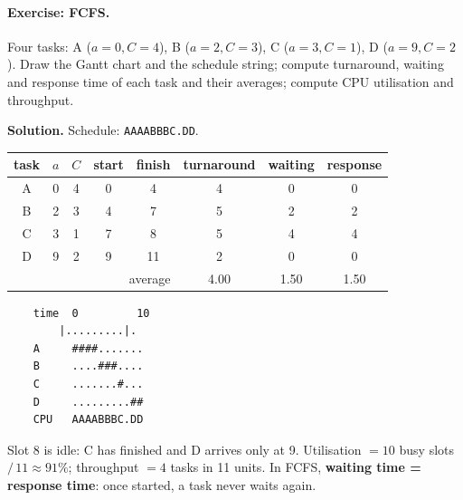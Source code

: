 \paragraph{Exercise: FCFS.} Four tasks: A ($a=0, C=4$), B ($a=2, C=3$), C ($a=3, C=1$), D ($a=9, C=2$). Draw the Gantt chart and the schedule string; compute turnaround, waiting and response time of each task and their averages; compute CPU utilisation and throughput.

\textbf{Solution.} Schedule: \texttt{AAAABBBC.DD}.
\begin{center}
    \begin{tabular}{c c c | c c c c c}
        \hline
        task & $a$ & $C$ & start & finish & turnaround & waiting & response \\
        \hline
        A & 0 & 4 & 0 & 4 & 4 & 0 & 0 \\
        B & 2 & 3 & 4 & 7 & 5 & 2 & 2 \\
        C & 3 & 1 & 7 & 8 & 5 & 4 & 4 \\
        D & 9 & 2 & 9 & 11 & 2 & 0 & 0 \\
        \hline
        \multicolumn{5}{r}{average} & 4.00 & 1.50 & 1.50 \\
    \end{tabular}
\end{center}

\begin{verbatim}
    time  0         10
        |.........|.
    A     ####.......
    B     ....###....
    C     .......#...
    D     .........##
    CPU   AAAABBBC.DD
\end{verbatim}

Slot 8 is idle: C has finished and D arrives only at 9. Utilisation $= 10$ busy slots $/\,11 \approx 91\%$; throughput $= 4$ tasks in 11 units. In FCFS, \textbf{waiting time = response time}: once started, a task never waits again.

